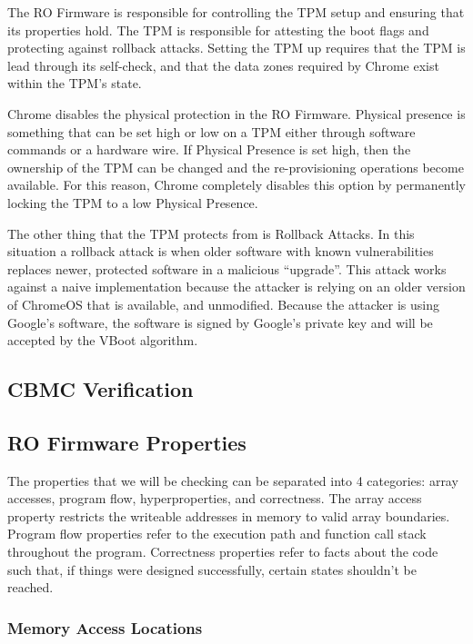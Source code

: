 \documentclass[../report.tex]{subfiles}
\begin{document}
The RO Firmware is responsible for controlling the TPM setup and ensuring that its properties hold. 
The TPM is responsible for attesting the boot flags and protecting against rollback attacks. 
Setting the TPM up requires that the TPM is lead through its self-check, and that the data zones required by Chrome exist within the TPM's state.

Chrome disables the physical protection in the RO Firmware.
Physical presence is something that can be set high or low on a TPM either through software commands or a hardware wire. 
If Physical Presence is set high, then the ownership of the TPM can be changed and the re-provisioning operations become available.
For this reason, Chrome completely disables this option by permanently locking the TPM to a low Physical Presence\@.

The other thing that the TPM protects from is Rollback Attacks.
In this situation a rollback attack is when older software with known vulnerabilities replaces newer, protected software in a malicious ``upgrade''.
This attack works against a naive implementation because the attacker is relying on an older version of ChromeOS that is available, and unmodified.
Because the attacker is using Google's software, the software is signed by Google's private key and will be accepted by the VBoot algorithm.

\subsection{CBMC Verification}

\subsection{RO Firmware Properties}

The properties that we will be checking can be separated into 4 categories: array accesses, program flow, hyperproperties, and correctness.
The array access property restricts the writeable addresses in memory to valid array boundaries. 
Program flow properties refer to the execution path and function call stack throughout the program.
Correctness properties refer to facts about the code such that, if things were designed successfully, certain states shouldn't be reached.


\subsubsection{Memory Access Locations}
\end{document}

